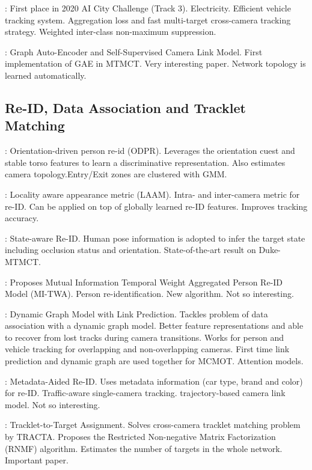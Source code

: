 \cite{Qian20}: First place in 2020 AI City Challenge (Track 3). Electricity. Efficient vehicle tracking system. Aggregation loss and fast multi-target cross-camera tracking strategy. Weighted inter-class non-maximum suppression.

\cite{Hsu22}: Graph Auto-Encoder and Self-Supervised Camera Link Model. First implementation of GAE in MTMCT. Very interesting paper. Network topology is learned automatically.

\subsection{Re-ID, Data Association and Tracklet Matching}

\cite{Jiang18}: Orientation-driven person re-id (ODPR). Leverages the orientation cuest and stable torso features to learn a discriminative representation. Also estimates camera topology.Entry/Exit zones are clustered with GMM.

\cite{Hou19}: Locality aware appearance metric (LAAM). Intra- and inter-camera metric for re-ID. Can be applied on top of globally learned re-ID features. Improves tracking accuracy.

\cite{Li19}: State-aware Re-ID. Human pose information is adopted to infer the target state including occlusion status and orientation. State-of-the-art result on Duke-MTMCT.

\cite{Li22b}: Proposes Mutual Information Temporal Weight Aggregated Person Re-ID Model (MI-TWA). Person re-identification. New algorithm. Not so interesting.

\cite{Quach21}: Dynamic Graph Model with Link Prediction. Tackles problem of data association with a dynamic graph model. Better feature representations and able to recover from lost tracks during camera transitions. Works for person and vehicle tracking for overlapping and non-overlapping cameras. First time link prediction and dynamic graph are used together for MCMOT. Attention models.

\cite{Hsu21}: Metadata-Aided Re-ID. Uses metadata information (car type, brand and color) for re-ID. Traffic-aware single-camera tracking. trajectory-based camera link model. Not so interesting.

\cite{He20a}: Tracklet-to-Target Assignment. Solves cross-camera tracklet matching problem by TRACTA. Proposes the Restricted Non-negative Matrix Factorization (RNMF) algorithm. Estimates the number of targets in the whole network. Important paper.

